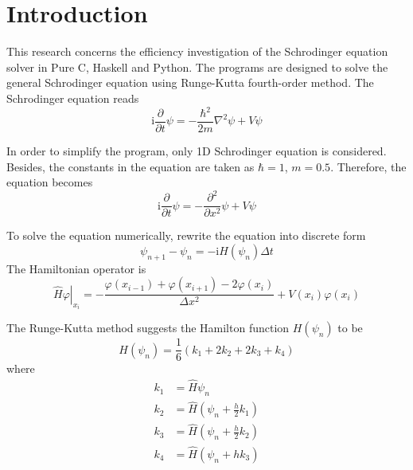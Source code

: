 \documentclass[11pt]{article}
\begin{document}
\clearpage
\setcounter{page}{2}

\newpage


\section{Introduction}

This research concerns the efficiency investigation of the Schrodinger equation solver in Pure C, Haskell and Python. The programs are designed to solve the general Schrodinger equation using Runge-Kutta fourth-order method. The Schrodinger equation reads
\begin{equation}
	\mathrm{i}\frac{\partial}{\partial t}\psi = -\frac{\hbar^2}{2m}\nabla^2\psi + V\psi
\end{equation}

In order to simplify the program, only 1D Schrodinger equation is considered. Besides, the constants in the equation are taken as $\hbar = 1$, $m = 0.5$. Therefore, the equation becomes
\begin{equation}
	\mathrm{i}\frac{\partial}{\partial t}\psi = -\frac{\partial^2}{\partial x^2}\psi + V\psi
\end{equation}

To solve the equation numerically, rewrite the equation into discrete form
\begin{equation}
	\psi_{n+1} - \psi_n = -\mathrm{i}H(\psi_n) \Delta t
\end{equation}
The Hamiltonian operator is
\begin{equation}
	\left.\hat{H}\varphi\right|_{x_i} = -\frac{\varphi(x_{i-1}) + \varphi(x_{i+1}) - 2\varphi(x_i)}{\Delta x^2} + V(x_i)\varphi(x_i)
\end{equation}

The Runge-Kutta method suggests the Hamilton function $H(\psi_n)$ to be
\begin{equation}
	H(\psi_n) = \frac{1}{6}(k_1 + 2k_2 + 2k_3 + k_4)
\end{equation}
where
\begin{equation}
	\begin{split}
		k_1 &= \hat{H}\psi_n\\
		k_2 &= \hat{H}(\psi_n + \frac{h}{2}k_1)\\
		k_3 &= \hat{H}(\psi_n + \frac{h}{2}k_2)\\
		k_4 &= \hat{H}(\psi_n + hk_3)
	\end{split}
\end{equation}
\end{document}
